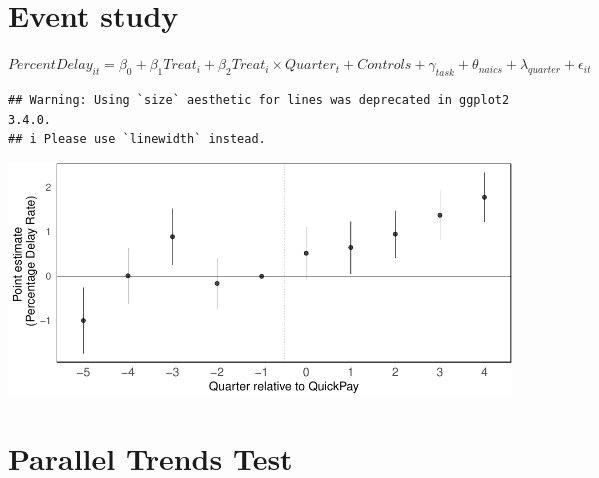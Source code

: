\documentclass[
]{article}
\begin{document}
\hypertarget{event-study}{%
\section{Event study}\label{event-study}}

\(PercentDelay_{it}=\beta_0 + \beta_1 Treat_i + \beta_2 Treat_i \times Quarter_t + Controls + \gamma_{task} + \theta_{naics}+\lambda_{quarter}+\epsilon_{it}\)

\begin{verbatim}
## Warning: Using `size` aesthetic for lines was deprecated in ggplot2 3.4.0.
## i Please use `linewidth` instead.
\end{verbatim}

\includegraphics{qp_first_pc_delay_clean_control_time_independent_files/figure-latex/event_study-1.pdf}

\hypertarget{parallel-trends-test}{%
\section{Parallel Trends Test}\label{parallel-trends-test}}
\end{document}

